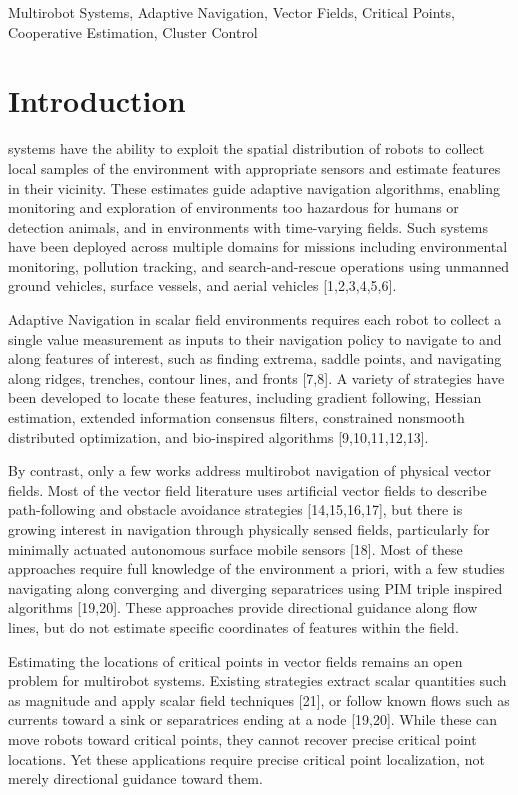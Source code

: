 \documentclass[lettersize,journal]{IEEEtran}
\begin{document}
\begin{IEEEkeywords}
Multirobot Systems, Adaptive Navigation, Vector Fields, Critical Points, Cooperative Estimation, Cluster Control
\end{IEEEkeywords}



\section{Introduction}

 systems have the ability to exploit the spatial distribution of robots to collect local samples of the environment with appropriate sensors and estimate features in their vicinity. These estimates guide adaptive navigation algorithms, enabling monitoring and exploration of environments too hazardous for humans or detection animals, and in environments with time-varying fields. Such systems have been deployed across multiple domains for missions including environmental monitoring, pollution tracking, and search-and-rescue operations using unmanned ground vehicles, surface vessels, and aerial vehicles [1,2,3,4,5,6].

Adaptive Navigation in scalar field environments requires each robot to collect a single value measurement as inputs to their navigation policy to navigate to and along features of interest, such as finding extrema, saddle points, and navigating along ridges, trenches, contour lines, and fronts [7,8]. A variety of strategies have been developed to locate these features, including gradient following, Hessian estimation, extended information consensus filters, constrained nonsmooth distributed optimization, and bio-inspired algorithms [9,10,11,12,13].

By contrast, only a few works address multirobot navigation of physical vector fields. Most of the vector field literature uses artificial vector fields to describe path-following and obstacle avoidance strategies [14,15,16,17], but there is growing interest in navigation through physically sensed fields, particularly for minimally actuated autonomous surface mobile sensors [18]. Most of these approaches require full knowledge of the environment a priori, with a few studies navigating along converging and diverging separatrices using PIM triple inspired algorithms [19,20]. These approaches provide directional guidance along flow lines, but do not estimate specific coordinates of features within the field.

Estimating the locations of critical points in vector fields remains an open problem for multirobot systems. Existing strategies extract scalar quantities such as magnitude and apply scalar field techniques [21], or follow known flows such as currents toward a sink or separatrices ending at a node [19,20]. While these can move robots toward critical points, they cannot recover precise critical point locations. Yet these applications require precise critical point localization, not merely directional guidance toward them.
\end{document}
